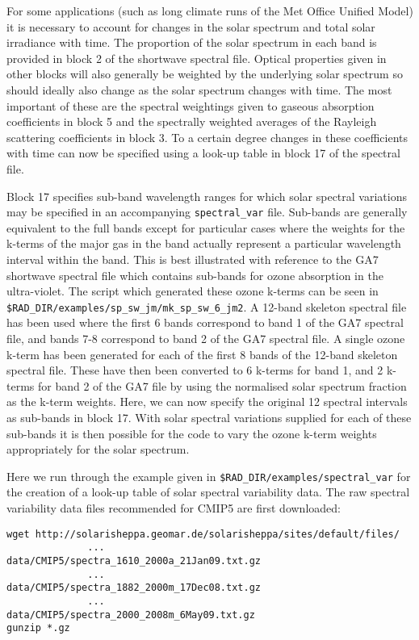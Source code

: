 \label{sec_spectral_var}

For some applications (such as long climate runs of the Met Office Unified Model) it is necessary to account for changes in the solar spectrum and total solar irradiance with time. The proportion of the solar spectrum in each band is provided in block 2 of the shortwave spectral file. Optical properties given in other blocks will also generally be weighted by the underlying solar spectrum so should ideally also change as the solar spectrum changes with time. The most important of these are the spectral weightings given to gaseous absorption coefficients in block 5 and the spectrally weighted averages of the Rayleigh scattering coefficients in block 3. To a certain degree changes in these coefficients with time can now be specified using a look-up table in block 17 of the spectral file.

Block 17 specifies sub-band wavelength ranges for which solar spectral variations may be specified in an accompanying {\tt spectral\_var} file. Sub-bands are generally equivalent to the full bands except for particular cases where the weights for the k-terms of the major gas in the band actually represent a particular wavelength interval within the band. This is best illustrated with reference to the GA7 shortwave spectral file which contains sub-bands for ozone absorption in the ultra-violet. The script which generated these ozone k-terms can be seen in {\tt \$RAD\_DIR/examples/sp\_sw\_jm/mk\_sp\_sw\_6\_jm2}. A 12-band skeleton spectral file has been used where the first 6 bands correspond to band 1 of the GA7 spectral file, and bands 7-8 correspond to band 2 of the GA7 spectral file. A single ozone k-term has been generated for each of the first 8 bands of the 12-band skeleton spectral file. These have then been converted to 6 k-terms for band 1, and 2 k-terms for band 2 of the GA7 file by using the normalised solar spectrum fraction as the k-term weights. Here, we can now specify the original 12 spectral intervals as sub-bands in block 17. With solar spectral variations supplied for each of these sub-bands it is then possible for the code to vary the ozone k-term weights appropriately for the solar spectrum. 

Here we run through the example given in {\tt \$RAD\_DIR/examples/spectral\_var} for the creation of a look-up table of solar spectral variability data. The raw spectral variability data files recommended for CMIP5 are first downloaded:

{\small
\begin{verbatim}
wget http://solarisheppa.geomar.de/solarisheppa/sites/default/files/
              ...                     data/CMIP5/spectra_1610_2000a_21Jan09.txt.gz
              ...                     data/CMIP5/spectra_1882_2000m_17Dec08.txt.gz
              ...                     data/CMIP5/spectra_2000_2008m_6May09.txt.gz
gunzip *.gz
\end{verbatim}
}

